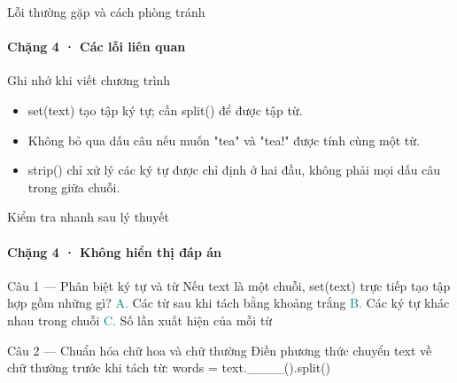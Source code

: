 \documentclass[aspectratio=169,10pt]{beamer}
\begin{document}
\begin{frame}[t]{Lỗi thường gặp và cách phòng tránh}
\framesubtitle{Chặng 4 · Các lỗi liên quan}
\begin{alertblock}{Ghi nhớ khi viết chương trình}
\begin{itemize}
\item set(text) tạo tập ký tự; cần split() để được tập từ.
\item Không bỏ qua dấu câu nếu muốn "tea" và "tea!" được tính cùng một từ.
\item strip() chỉ xử lý các ký tự được chỉ định ở hai đầu, không phải mọi dấu câu trong giữa chuỗi.
\end{itemize}
\end{alertblock}

\end{frame}

\begin{frame}[t]{Kiểm tra nhanh sau lý thuyết}
\framesubtitle{Chặng 4 · Không hiển thị đáp án}
\small\begin{block}{Câu 1 — Phân biệt ký tự và từ}
Nếu text là một chuỗi, set(text) trực tiếp tạo tập hợp gồm những gì?
\medskip
\quad \textcolor{teal}{A.} Các từ sau khi tách bằng khoảng trắng\hspace{3mm}
\quad \textcolor{teal}{B.} Các ký tự khác nhau trong chuỗi\hspace{3mm}
\quad \textcolor{teal}{C.} Số lần xuất hiện của mỗi từ\hspace{3mm}
\end{block}
\begin{block}{Câu 2 — Chuẩn hóa chữ hoa và chữ thường}
Điền phương thức chuyển text về chữ thường trước khi tách từ: words = text.\_\_\_\_().split()
\end{block}
\end{frame}
\end{document}
